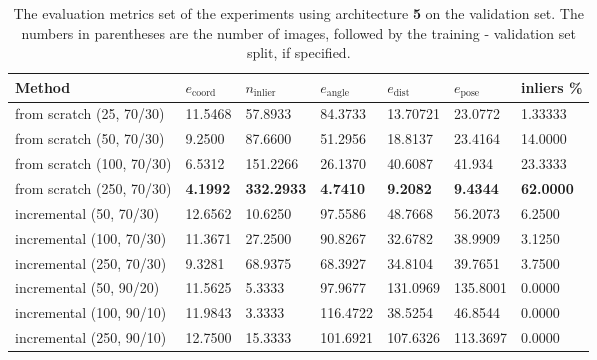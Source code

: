 \begin{table}[]
\centering
\begin{tabular}{l||llllll}
Method                   & $e_{\text{coord}}$ & $n_{\text{inlier}}$ & $e_{\text{angle}}$ & $e_{\text{dist}}$ & $e_{\text{pose}}$ & inliers \% \\ \hline \hline
from scratch (25, 70/30)        & 11.5468            & 57.8933                   & 84.3733            & 13.70721           & 23.0772  &    1.33333      \\ \hline
from scratch (50, 70/30)        & 9.2500             & 87.6600                  & 51.2956            & 18.8137           & 23.4164 & 14.0000           \\  \hline 
from scratch (100, 70/30)       & 6.5312             & 151.2266                 & 26.1370             & 40.6087            & 41.934 &    23.3333        \\ \hline 
from scratch (250, 70/30)       & \textbf{4.1992}             & \textbf{332.2933}                 & \textbf{4.7410}             & \textbf{9.2082}            & \textbf{9.4344} & \textbf{62.0000}            \\ \hline \hline
incremental (50, 70/30)  & 12.6562            & 10.6250                   & 97.5586          & 48.7668           & 56.2073 & 6.2500           \\ \hline
incremental (100, 70/30) & 11.3671            & 27.2500                  & 90.8267           & 32.6782           & 38.9909 & 3.1250           \\ \hline
incremental (250, 70/30) & 9.3281             & 68.9375                  & 68.3927           & 34.8104          & 39.7651 &  3.7500         \\ \hline \hline 
incremental (50, 90/20)  & 11.5625            & 5.3333                   & 97.9677           & 131.0969           & 135.8001 & 0.0000          \\ \hline 
incremental (100, 90/10) & 11.9843             & 3.3333                 & 116.4722            & 38.5254          & 46.8544 & 0.0000         \\ \hline
incremental (250, 90/10) & 12.7500            & 15.3333                 & 101.6921            & 107.6326            & 113.3697 & 0.0000         
\end{tabular}
\caption{The evaluation metrics set of the experiments using architecture \textbf{5} on the validation set. The numbers in parentheses are the number of images, followed by the training - validation set split, if specified.}
\label{table:experiments_online_sratch_arch5}
\end{table}

